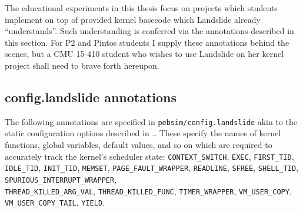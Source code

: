 The educational experiments in this thesis focus on projects which students implement on top of provided kernel basecode which Landslide already ``understands''.
Such understanding is conferred via the annotations described in this section.
For P2 and Pintos students I supply these annotations behind the scenes,
but a CMU 15-410 student who wishes to use Landslide on her kernel project shall need to brave forth hereupon.


\subsection{config.landslide annotations}
\label{sec:landslide-config-landslide}

The following annotations are specified in {\tt pebsim/config.landslide} akin to the static configuration options
described in \sect{\ref{sec:landslide-directly}}..
These specify the names of kernel functions, global variables, default values, and so on
which are required to accurately track the kernel's scheduler state:
{\tt CONTEXT\_SWITCH},
{\tt EXEC},
{\tt FIRST\_TID},
{\tt IDLE\_TID},
{\tt INIT\_TID},
{\tt MEMSET},
{\tt PAGE\_FAULT\_WRAPPER},
{\tt READLINE},
{\tt SFREE},
{\tt SHELL\_TID},
{\tt SPURIOUS\_INTERRUPT\_WRAPPER},
\\
{\tt THREAD\_KILLED\_ARG\_VAL},
{\tt THREAD\_KILLED\_FUNC},
{\tt TIMER\_WRAPPER},
{\tt VM\_USER\_COPY},
\\
{\tt VM\_USER\_COPY\_TAIL},
{\tt YIELD}.

